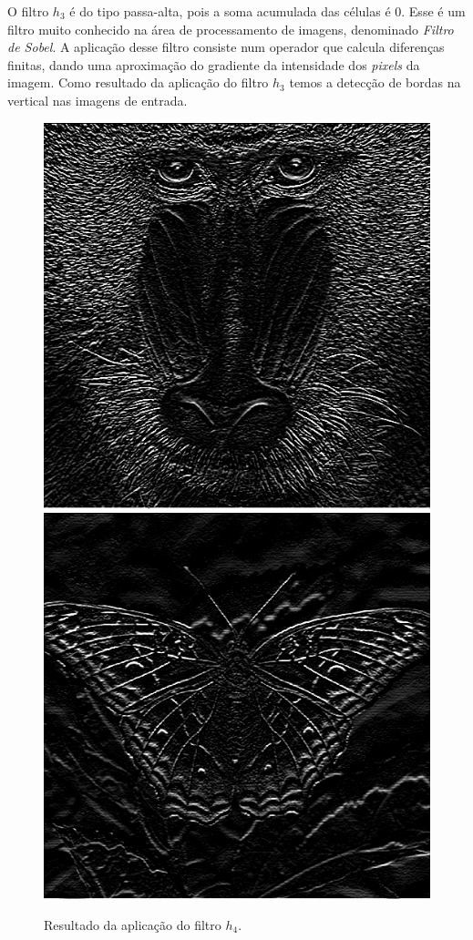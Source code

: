 \documentclass[twoside,twocolumn]{article}
\begin{document}
O filtro $h_{3}$ é do tipo passa-alta, pois a soma acumulada das células é 0. Esse é um filtro muito conhecido na área de processamento de imagens, denominado \textit{Filtro de Sobel}. A aplicação desse filtro consiste num operador que calcula diferenças finitas, dando uma aproximação do gradiente da intensidade dos \textit{pixels} da imagem. Como resultado da aplicação do filtro $h_{3}$ temos a detecção de bordas na vertical nas imagens de entrada.

\begin{figure}[H]
\begin{center}
	\includegraphics[scale=.19]{figures/baboon_h4.png}
	\includegraphics[scale=.19]{figures/butterfly_h4.png}
\caption{Resultado da aplicação do filtro $h_{4}$.} \label{gdimotes}
\end{center}
\end{figure}
\end{document}
